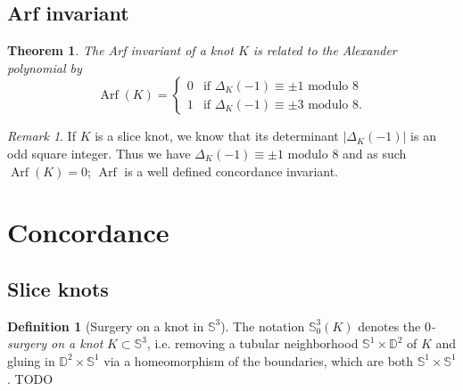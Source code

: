 \documentclass[nobib]{tufte-book} %
\newtheorem{theorem}{Theorem}
\theoremstyle{definition}
\newtheorem{definition}{Definition}
\theoremstyle{remark}
\newtheorem{remark}{Remark}
\DeclareMathOperator{\Arf}{Arf}
\newcommand{\sphere}[1]{\mathbb{S}^{#1}}
\newcommand{\disk}[1]{\mathbb{D}^{#1}}
\begin{document}
\subsection{Arf invariant}

\begin{theorem}
	The Arf invariant of a knot $K$ is related to the Alexander polynomial by
	\begin{equation*}
		\Arf(K) =
		\begin{cases}
			0 & \textrm{if } \Delta_{K}(-1) \equiv \pm 1 \textrm{ modulo } 8 \\
			1 & \textrm{if } \Delta_{K}(-1) \equiv \pm 3 \textrm{ modulo } 8.
		\end{cases}
	\end{equation*}
\end{theorem}

\begin{remark}
	If $K$ is a slice knot, we know that its determinant
	$| \Delta_{K}(-1) |$ is an odd square integer.
	Thus we have $\Delta_{K}(-1) \equiv \pm 1 \textrm{ modulo } 8$
	and as such $\Arf(K) = 0$; $\Arf$ is a well defined concordance invariant.
\end{remark}

\section{Concordance}

\subsection{Slice knots}

\begin{definition}[Surgery on a knot in $\sphere{3}$]
	The notation $\sphere{3}_{0}(K)$ denotes the \textit{$0$-surgery on a knot}
	$K \subset \sphere{3}$, i.e. removing a tubular neighborhood
	$\sphere{1} \times \disk{2}$ of $K$ and gluing in $\disk{2} \times \sphere{1}$
	via a homeomorphism of the boundaries, which are both $\sphere{1} \times \sphere{1}$.
	TODO %
\end{definition}
\end{document}
